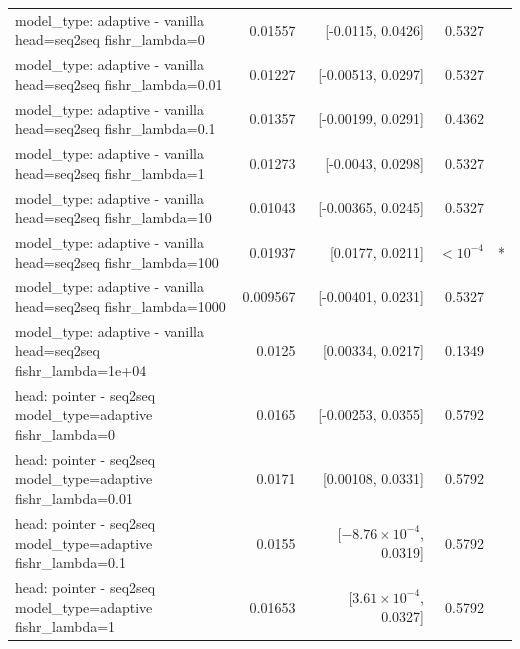 \documentclass[10pt]{article}
\makeatletter
\newcommand{\stackcell}[1]{\begin{tabular}[t]{@{}l@{}}#1\end{tabular}}
\makeatother
\begin{document}
{\begin{longtable}{lrrrl}
\stackcell{model\_type: adaptive - vanilla\\\footnotesize head=seq2seq fishr\_lambda=0 } & 0.01557 & [-0.0115, 0.0426] & 0.5327 & \\
\stackcell{model\_type: adaptive - vanilla\\\footnotesize head=seq2seq fishr\_lambda=0.01 } & 0.01227 & [-0.00513, 0.0297] & 0.5327 & \\
\stackcell{model\_type: adaptive - vanilla\\\footnotesize head=seq2seq fishr\_lambda=0.1 } & 0.01357 & [-0.00199, 0.0291] & 0.4362 & \\
\stackcell{model\_type: adaptive - vanilla\\\footnotesize head=seq2seq fishr\_lambda=1 } & 0.01273 & [-0.0043, 0.0298] & 0.5327 & \\
\stackcell{model\_type: adaptive - vanilla\\\footnotesize head=seq2seq fishr\_lambda=10 } & 0.01043 & [-0.00365, 0.0245] & 0.5327 & \\
\stackcell{model\_type: adaptive - vanilla\\\footnotesize head=seq2seq fishr\_lambda=100 } & 0.01937 & [0.0177, 0.0211] & $<10^{-4}$ & *\\
\stackcell{model\_type: adaptive - vanilla\\\footnotesize head=seq2seq fishr\_lambda=1000 } & 0.009567 & [-0.00401, 0.0231] & 0.5327 & \\
\stackcell{model\_type: adaptive - vanilla\\\footnotesize head=seq2seq fishr\_lambda=1e+04 } & 0.0125 & [0.00334, 0.0217] & 0.1349 & \\
\stackcell{head: pointer - seq2seq\\\footnotesize model\_type=adaptive fishr\_lambda=0 } & 0.0165 & [-0.00253, 0.0355] & 0.5792 & \\
\stackcell{head: pointer - seq2seq\\\footnotesize model\_type=adaptive fishr\_lambda=0.01 } & 0.0171 & [0.00108, 0.0331] & 0.5792 & \\
\stackcell{head: pointer - seq2seq\\\footnotesize model\_type=adaptive fishr\_lambda=0.1 } & 0.0155 & [$-8.76\times10^{-4}$, 0.0319] & 0.5792 & \\
\stackcell{head: pointer - seq2seq\\\footnotesize model\_type=adaptive fishr\_lambda=1 } & 0.01653 & [$3.61\times10^{-4}$, 0.0327] & 0.5792 & \\

\end{longtable}}
\end{document}
